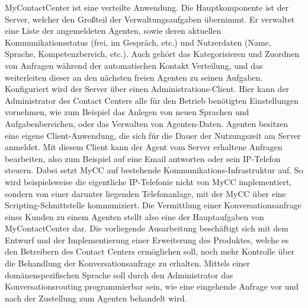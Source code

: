 MyContactCenter ist eine verteilte Anwendung. Die Hauptkomponente ist der Server, welcher den Großteil der Verwaltungsaufgaben übernimmt. Er verwaltet eine Liste der angemeldeten Agenten, sowie deren aktuellen Kommunikationsstatus (frei, im Gespräch, etc.) und Nutzerdaten (Name, Sprache, Kompetenzbereich, etc.). Auch gehört das Kategorisieren und Zuordnen von Anfragen während der automatischen Kontakt Verteilung, und das weiterleiten dieser an den nächsten freien Agenten zu seinen Aufgaben. Konfiguriert wird der Server über einen Administrations-Client. Hier kann der Administrator des Contact Centers alle für den Betrieb benötigten Einstellungen vornehmen, wie zum Beispiel das Anlegen von neuen Sprachen und Aufgabenbereichen, oder das Verwalten von Agenten-Daten. Agenten besitzen eine eigene Client-Anwendung, die sich für die Dauer der Nutzungszeit am Server anmeldet.  Mit diesem Client kann der Agent vom Server erhaltene Anfragen bearbeiten, also zum Beispiel auf eine Email antworten oder sein IP-Telefon steuern. Dabei setzt MyCC auf bestehende Kommunikations-Infrastruktur auf. So wird beispielsweise die eigentliche IP-Telefonie nicht von MyCC implementiert, sondern von einer darunter liegenden Telefonanlage, mit der MyCC über eine Scripting-Schnittstelle kommuniziert.
\newline
Die Vermittlung einer Konversationsanfrage eines Kunden zu einem Agenten stellt also eine der Hauptaufgaben von MyContactCenter dar. Die vorliegende Ausarbeitung beschäftigt sich mit dem Entwurf und der Implementierung einer Erweiterung des Produktes, welche es den Betreibern des Contact Centers ermöglichen soll, noch mehr Kontrolle über die Behandlung der Konversationsanfrage zu erhalten. Mittels einer domänenspezifischen Sprache soll durch den Administrator das Konversationsrouting programmierbar sein, wie eine eingehende Anfrage vor und nach der Zustellung zum Agenten behandelt wird.  

